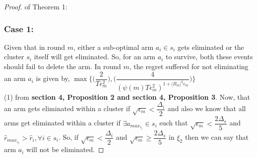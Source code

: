 
\begin{proof} of Theorem 1: 
\subsubsection{Case 1:}
Given that in round $m$, either a sub-optimal arm $a_{i}\in s_{i}$ gets eliminated or the cluster $s_{i}$ itself will get eliminated. So, for an arm $a_{i}$ to survive, both these events should fail to delete the arm. In round $m$, the regret suffered for not eliminating an arm $a_{i}$ is given by,
\newline
\hspace*{1em} $\max{\bigg\lbrace \bigg(\dfrac{2}{T\epsilon_{m}^{2}}\bigg) ,\bigg(\dfrac{4}{(\psi(m)T\epsilon_{m}^{2})^{1+|B_{m}|^{2}\epsilon_{m}}}\bigg)\bigg\rbrace}$ ~~~~~~~~~~~~~~~~ (1)
\newline
\newline from \textbf{section 4, Proposition 2 and section 4, Proposition 3}.
\newline
Now, that an arm gets eliminated within a cluster if $\sqrt{\epsilon_{m}}<\dfrac{\Delta_{i}}{2}$ and also we know that all arms get eliminated within a cluster if $\exists a_{max_{s_{i}}}\in s_{i}$ such that $\sqrt{\epsilon_{m}}<\dfrac{2\Delta_{s}}{5}$ and $\hat{r}_{max_{s_{i}}}>\hat{r}_{i},\forall i\in s_{i}$. So, if $\sqrt{\epsilon_{m}}<\dfrac{\Delta_{i}}{2}$ and $\sqrt{\epsilon_{m}}\geq\dfrac{2\Delta_{s}}{5}$ in $\xi_{2}$ then we can say that arm $a_{i}$ will not be eliminated. 
\newline

\end{proof}
